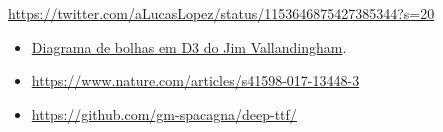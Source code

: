 \documentclass[]{book}
\begin{document}
\url{https://twitter.com/aLucasLopez/status/1153646875427385344?s=20}

\begin{itemize}
\item
  \href{https://vallandingham.me/bubble_charts_with_d3v4.html}{Diagrama de bolhas em D3 do Jim Vallandingham}.
\item
  \url{https://www.nature.com/articles/s41598-017-13448-3}
\item
  \url{https://github.com/gm-spacagna/deep-ttf/}
\end{itemize}


\end{document}

